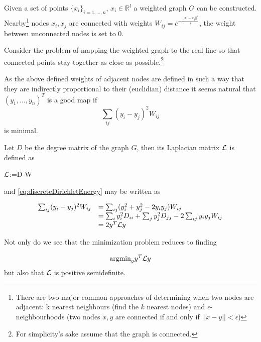Given a set of points $\{x_i\}_{i=1,\dots,n}$, $x_i \in \mathbb{R}^l$ a weighted graph $G$ can be constructed. Nearby\footnote{There are two major common approaches of determining when two nodes are adjacent: k nearest neighbours (find the $k$ nearest nodes) and $\epsilon$-neighbourhoods (two nodes $x,y$ are connected if and only if $||x-y||<\epsilon$)} nodes $x_i,x_j$ are connected with weights $W_{ij}=e^{-\frac{||x_i - x_j||^2}{t}}$, the weight between unconnected nodes is set to $0$.

Consider the problem of mapping the weighted graph to the real line so that connected points stay together as close as possible.\footnote{For simplicity's sake assume that the graph is connected.}

As the above defined weights of adjacent nodes are defined in such a way that they are indirectly proportional to their (euclidian) distance it seems natural that $(y_1,\dots,y_n)^T$ is a good map if
\begin{equation} \label{eq:discreteDirichletEnergy}
    \sum_{ij} (y_i - y_j)^2 W_{ij}
\end{equation}
is minimal.

Let $D$ be the degree matrix of the graph $G$, then its Laplacian matrix $\mathcal{L}$ is defined as
\begin{definition}
    $\mathcal{L}$:=D-W
\end{definition}

and \eqref{eq:discreteDirichletEnergy} may be written as 

\begin{equation*}\begin{array}{l l}
\sum_{ij} (y_i - y_j)^2 W_{ij} &= \sum_{ij} (y_i^2 + y_j^2 - 2y_i y_j) W_{ij}\\
    &= \sum_{i} y_i^2 D_{ii} + \sum_{j} y_j^2 D_{jj} - 2\sum_{ij} y_i y_j W_{ij}\\
    &= 2y^T\mathcal{L} y
\end{array}\end{equation*}

Not only do we see that the minimization problem reduces to finding

\begin{equation*}
    \text{argmin}_y y^T\mathcal{L} y
\end{equation*}
but also that $\mathcal{L}$ is positive semidefinite.

